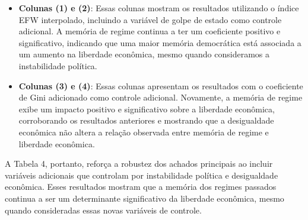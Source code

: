 	\begin{itemize}
		\item \textbf{Colunas (1) e (2)}: Essas colunas mostram os resultados utilizando o índice EFW interpolado, incluindo a variável de golpe de estado como controle adicional. A memória de regime continua a ter um coeficiente positivo e significativo, indicando que uma maior memória democrática está associada a um aumento na liberdade econômica, mesmo quando consideramos a instabilidade política.
		\item \textbf{Colunas (3) e (4)}: Essas colunas apresentam os resultados com o coeficiente de Gini adicionado como controle adicional. Novamente, a memória de regime exibe um impacto positivo e significativo sobre a liberdade econômica, corroborando os resultados anteriores e mostrando que a desigualdade econômica não altera a relação observada entre memória de regime e liberdade econômica.
	\end{itemize}
	
	A Tabela 4, portanto, reforça a robustez dos achados principais ao incluir variáveis adicionais que controlam por instabilidade política e desigualdade econômica. Esses resultados mostram que a memória dos regimes passados continua a ser um determinante significativo da liberdade econômica, mesmo quando consideradas essas novas variáveis de controle.

